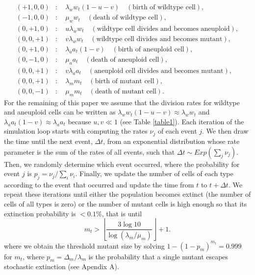 \documentclass[12pt]{extarticle}
\begin{document}
\begin{subequations}
\begin{flalign*}
(+1,0,0)&:\quad \lambda_ww_t\left(1-u-v\right)\quad\left(\text{birth of wildtype cell}\right),\\
(-1,0,0)&:\quad \mu_ww_t\quad\left(\text{death of wildtype cell}\right),\\
(0,+1,0)&:\quad u\lambda_ww_t\quad\left(\text{wildtype cell divides and becomes aneuploid}\right),\\
(0,0,+1)&:\quad v\lambda_ww_t\quad\left(\text{wildtype cell divides and becomes mutant}\right),\\
(0,+1,0)&:\quad \lambda_aa_t\left(1-v\right)\quad\left(\text{birth of aneuploid cell}\right),\\
(0,-1,0)&:\quad \mu_aa_t\quad\left(\text{death of aneuploid cell}\right),\\
(0,0,+1)&:\quad v\lambda_aa_t\quad\left(\text{aneuploid cell divides and becomes mutant}\right),\\
(0,0,+1)&:\quad \lambda_mm_t\quad\left(\text{birth of mutant cell}\right),\\
(0,0,-1)&:\quad \mu_mm_t\quad\left(\text{death of mutant cell}\right).
\end{flalign*}
\end{subequations}
For the remaining of this paper we assume that the division rates for wildtype and aneuploid cells can be written as $\lambda_ww_t\left(1-u-v\right)\approx \lambda_ww_t$ and $\lambda_aa_t\left(1-v\right)\approx\lambda_aa_t$ because $u,v\ll1$ (see Table \ref{table1}).
Each iteration of the simulation loop starts with computing the rates $\nu_j$ of each event $j$.
We then draw the time until the next event, $\Delta t$, from an exponential distribution whose rate parameter is the sum of the rates of all events, such that $\Delta t \sim \textit{Exp}(\sum_j \nu_j)$.
Then, we randomly determine which event occurred, where the probability for event $j$ is $p_j=\nu_j/\sum_i \nu_i$.
Finally, we update the number of cells of each type according to the event that occurred and update the time from $t$ to $t+\Delta t$.
We repeat these iterations until either the population becomes extinct (the number of cells of all types is zero) or the number of mutant cells is high enough so that its extinction probability is $<0.1\%$, that is until
\begin{equation*}
m_t > \left\lfloor\frac{3\log10}{\log\left(\lambda_m / \mu_m\right)}\right\rfloor + 1.
\end{equation*}
where we obtain the threshold mutant size by solving $1-(1-p_m)^{m_t}=0.999$ for $m_t$, where $p_m=\Delta_m/\lambda_m$ is the probability that a single mutant escapes stochastic extinction  (see Apendix A).
\end{document}
